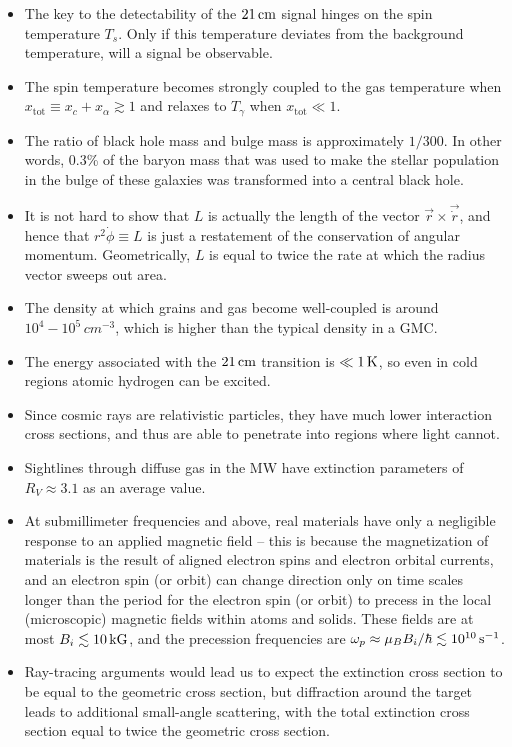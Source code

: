 \documentclass[a4paper,10pt]{article}
\begin{document}
\begin{itemize}
    \item The key to the detectability of the $21\,{\rm cm}$ signal hinges on the spin temperature $T_s$. Only if this temperature deviates from the background temperature, will a signal be observable.
    \item The spin temperature becomes strongly coupled to the gas temperature when $x_\mathrm{tot}\equiv x_c+x_\alpha\gtrsim1$ and relaxes to $T_\gamma$ when $x_\mathrm{tot}\ll1$.
    \item The ratio of black hole mass and bulge mass is approximately $1/300$. In other words, 0.3\% of the baryon mass that was used to make the stellar population in the bulge of these galaxies was transformed into a central black hole.
    \item It is not hard to show that $L$ is actually the length of the vector $\vec{r}\times\vec{\dot{r}}$, and hence that $r^2\dot{\phi}\equiv L$ is just a restatement of the conservation of angular momentum. Geometrically, $L$ is equal to twice the rate at which the radius vector sweeps out area.
    \item The density at which grains and gas become well-coupled is around $10^4-10^5\,{cm^{-3}}$, which is higher than the typical density in a GMC.
    \item The energy associated with the $21\,{\rm cm}$ transition is $\ll1\,{\rm K}$, so even in cold regions atomic hydrogen can be excited.
    \item Since cosmic rays are relativistic particles, they have much lower interaction cross sections, and thus are able to penetrate into regions where light cannot.
    \item Sightlines through diffuse gas in the MW have extinction parameters of $R_V\approx3.1$ as an average value.
    \item At submillimeter frequencies and above, real materials have only a negligible response to an applied magnetic field -- this is because the magnetization of materials is the result of aligned electron spins and electron orbital currents, and an electron spin (or orbit) can change direction only on time scales longer than the period for the electron spin (or orbit) to precess in the local (microscopic) magnetic fields within atoms and solids. These fields are at most $B_i\lesssim10\,{\rm kG}$, and the precession frequencies are $\omega_p\approx \mu_BB_i/\hbar\lesssim10^{10}\,{\rm s^{-1}}$.
    \item Ray-tracing arguments would lead us to expect the extinction cross section to be equal to the geometric cross section, but diffraction around the target leads to additional small-angle scattering, with the total extinction cross section equal to twice the geometric cross section.

\end{itemize}
\end{document}
